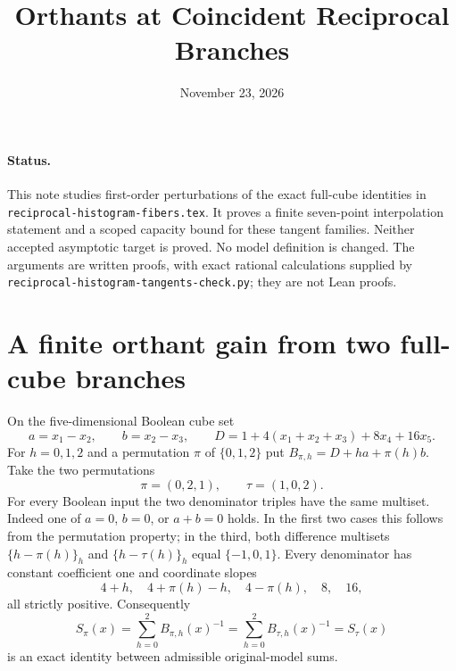 \documentclass[11pt]{article}
\title{Orthants at Coincident Reciprocal Branches}
\author{}
\date{November 23, 2026}
\begin{document}
\maketitle

\paragraph{Status.}
This note studies first-order perturbations of the exact full-cube
identities in \texttt{reciprocal-histogram-fibers.tex}. It proves a
finite seven-point interpolation statement and a scoped capacity bound
for these tangent families. Neither accepted asymptotic target is
proved. No model definition is changed. The arguments are written
proofs, with exact rational calculations supplied by
\texttt{reciprocal-histogram-tangents-check.py}; they are not Lean proofs.

\section{A finite orthant gain from two full-cube branches}
On the five-dimensional Boolean cube set
\[
 a=x_1-x_2,\qquad b=x_2-x_3,\qquad
 D=1+4(x_1+x_2+x_3)+8x_4+16x_5.
\]
For $h=0,1,2$ and a permutation $\pi$ of $\{0,1,2\}$ put
$B_{\pi,h}=D+ha+\pi(h)b$.
Take the two permutations
\[
 \pi=(0,2,1),\qquad \tau=(1,0,2).
\]
For every Boolean input the two denominator triples have the same
multiset. Indeed one of $a=0$, $b=0$, or $a+b=0$ holds. In the first
two cases this follows from the permutation property; in the third,
both difference multisets $\{h-\pi(h)\}_h$ and
$\{h-\tau(h)\}_h$ equal $\{-1,0,1\}$.
Every denominator has constant coefficient one and coordinate slopes
\[
 4+h,\quad4+\pi(h)-h,\quad4-\pi(h),\quad8,\quad16,
\]
all strictly positive. Consequently
\[
 S_\pi(x)=\sum_{h=0}^2B_{\pi,h}(x)^{-1}
          =\sum_{h=0}^2B_{\tau,h}(x)^{-1}=S_\tau(x)
\]
is an exact identity between admissible original-model sums.
\end{document}
